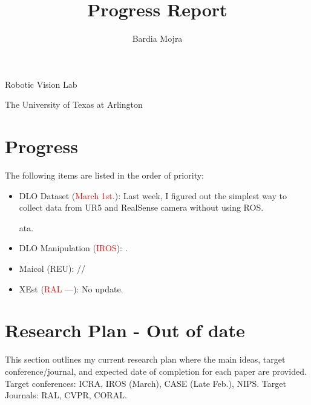 \documentclass[11pt]{article}
\title{Progress Report}
\author{Bardia Mojra}
\begin{document}
\maketitle
\thispagestyle{empty}

\bigskip
\bigskip
\begin{center}
 Robotic Vision Lab
\end{center}

\begin{center}
The University of Texas at Arlington
\end{center}

\newpage



\section{Progress}
The following items are listed in the order of priority:
\begin{itemize}
  \item DLO Dataset (\textcolor{red}{March 1st.}): Last week, I figured out the 
  simplest way to collect data from UR5 and RealSense camera without using ROS. 
  
ata.

  \item DLO Manipulation (\textcolor{red}{IROS}): \cite{abraham2017model}.\\
  \item Maicol (REU): //
  \item XEst (\textcolor{red}{RAL ---}): No update.\\
  \end{itemize}
\newpage

\newpage



\section{Research Plan - Out of date}
This section outlines my current research plan where the main ideas, target
conference/journal, and expected date of completion for each paper
are provided.
Target conferences: ICRA, IROS (March), CASE (Late Feb.), NIPS.
Target Journals: RAL, CVPR, CORAL.
\end{document}
